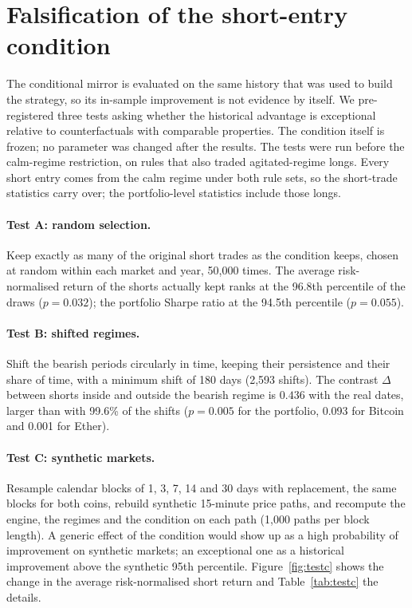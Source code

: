 \documentclass[11pt,a4paper]{article}
\newcommand{\1}{\mathbf{1}}
\begin{document}
\section{Falsification of the short-entry condition}\label{sec:falsification}

The conditional mirror is evaluated on the same history that was used to build the strategy, so its in-sample improvement is not evidence by itself. We pre-registered three tests asking whether the historical advantage is exceptional relative to counterfactuals with comparable properties. The condition itself is frozen; no parameter was changed after the results. The tests were run before the calm-regime restriction, on rules that also traded agitated-regime longs. Every short entry comes from the calm regime under both rule sets, so the short-trade statistics carry over; the portfolio-level statistics include those longs.

\paragraph{Test A: random selection.} Keep exactly as many of the original short trades as the condition keeps, chosen at random within each market and year, 50{,}000 times. The average risk-normalised return of the shorts actually kept ranks at the 96.8th percentile of the draws ($p=0.032$); the portfolio Sharpe ratio at the 94.5th percentile ($p=0.055$).

\paragraph{Test B: shifted regimes.} Shift the bearish periods circularly in time, keeping their persistence and their share of time, with a minimum shift of 180 days (2{,}593 shifts). The contrast $\Delta$ between shorts inside and outside the bearish regime is $0.436$ with the real dates, larger than with 99.6\% of the shifts ($p=0.005$ for the portfolio, 0.093 for Bitcoin and 0.001 for Ether).

\paragraph{Test C: synthetic markets.} Resample calendar blocks of 1, 3, 7, 14 and 30 days with replacement, the same blocks for both coins, rebuild synthetic 15-minute price paths, and recompute the engine, the regimes and the condition on each path (1,000 paths per block length). A generic effect of the condition would show up as a high probability of improvement on synthetic markets; an exceptional one as a historical improvement above the synthetic 95th percentile. Figure~\ref{fig:testc} shows the change in the average risk-normalised short return and Table~\ref{tab:testc} the details.
\end{document}
